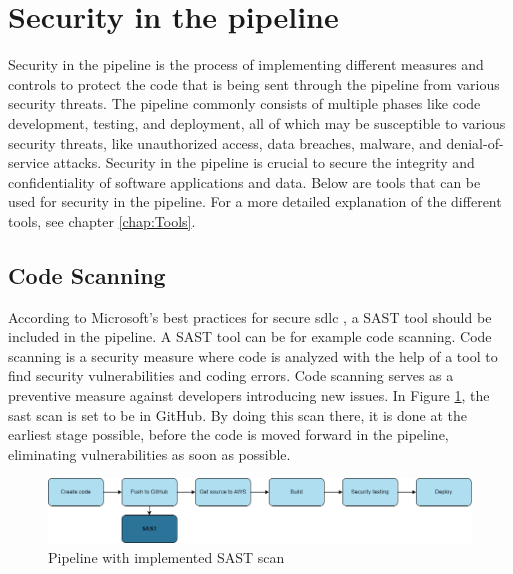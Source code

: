 \section{Security in the pipeline}
Security in the pipeline is the process of implementing different measures and controls to protect the code that is being sent through the pipeline from various security threats. The pipeline commonly consists of multiple phases like code development, testing, and deployment, all of which may be susceptible to various security threats, like unauthorized access, data breaches, malware, and denial-of-service attacks. Security in the pipeline is crucial to secure the integrity and confidentiality of software applications and data.
Below are tools that can be used for security in the pipeline. For a more detailed explanation of the different tools, see chapter \ref{chap:Tools}. 

\subsection{Code Scanning}
\label{Code Scanning}
According to Microsoft's best practices for secure \acrshort{sdlc} \cite{microsoftSDLCpractices}, a SAST tool should be included in the pipeline. A SAST tool can be for example code scanning. Code scanning is a security measure where code is analyzed with the help of a tool to find security vulnerabilities and coding errors. Code scanning serves as a preventive measure against developers introducing new issues. In Figure \ref{fig: Pipeline with implemented SAST scan}, the \acrshort{sast} scan is set to be in GitHub. By doing this scan there, it is done at the earliest stage possible, before the code is moved forward in the pipeline, eliminating vulnerabilities as soon as possible.

 \vspace{2mm}
\begin{figure}[H]
    \centering
    \includegraphics[width=0.8\columnwidth]{Images/pipeline2.png}
    \caption{Pipeline with implemented SAST scan}
    \label{fig: Pipeline with implemented SAST scan}
\end{figure}

